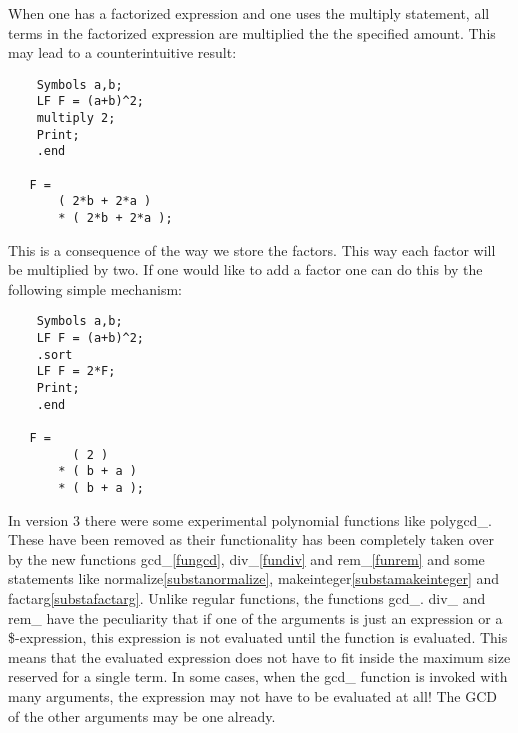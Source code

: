 \noindent When one has a factorized expression and one uses the multiply 
statement, all terms in the factorized expression are multiplied the the 
specified amount. This may lead to a counterintuitive result:
\begin{verbatim}
    Symbols a,b;
    LF F = (a+b)^2;
    multiply 2;
    Print;
    .end

   F =
       ( 2*b + 2*a )
       * ( 2*b + 2*a );
\end{verbatim}
This is a consequence of the way we store the factors. This way each factor 
will be multiplied by two. If one would like to add a factor one can do 
this by the following simple mechanism:
\begin{verbatim}
    Symbols a,b;
    LF F = (a+b)^2;
    .sort
    LF F = 2*F;
    Print;
    .end

   F =
         ( 2 )
       * ( b + a )
       * ( b + a );
\end{verbatim}

\noindent In version 3 there were some experimental polynomial functions 
like polygcd\_. These have been 
removed as their functionality has been completely taken over by the new 
functions gcd\_\ref{fungcd}, div\_\ref{fundiv} and rem\_\ref{funrem} and 
some statements like normalize\ref{substanormalize}, 
makeinteger\ref{substamakeinteger} and factarg\ref{substafactarg}. Unlike 
regular functions, the functions gcd\_. div\_ and rem\_ have the 
peculiarity that if one of the arguments is just an expression or a 
\$-expression, this expression is not evaluated until the function is 
evaluated. This means that the evaluated expression does not have to fit 
inside the maximum size reserved for a single term. In some cases, when the 
gcd\_ function is invoked with many arguments, the expression may not have 
to be evaluated at all! The GCD of the other arguments may be one already.



